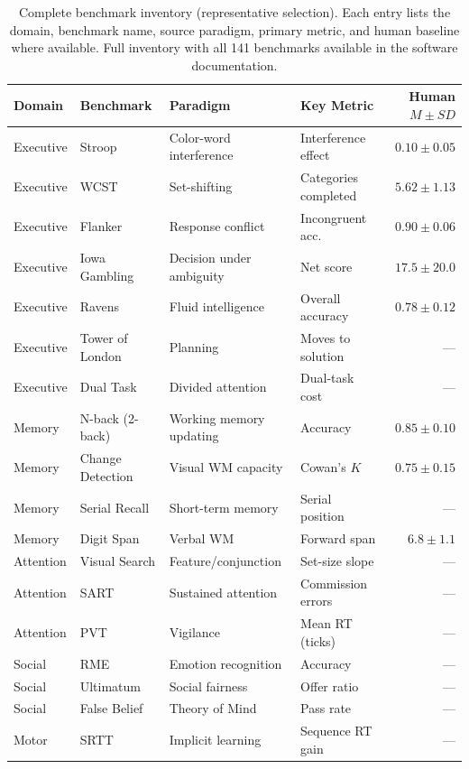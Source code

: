 \documentclass[11pt,letterpaper]{article}
\begin{document}
\begin{table}[p]
\centering
\caption{Complete benchmark inventory (representative selection). Each entry lists the domain, benchmark name, source paradigm, primary metric, and human baseline where available. Full inventory with all 141 benchmarks available in the software documentation.}
\label{tab:inventory}
\small
\begin{tabular}{@{}llllr@{}}
\toprule
\textbf{Domain} & \textbf{Benchmark} & \textbf{Paradigm} & \textbf{Key Metric} & \textbf{Human $M \pm SD$} \\
\midrule
Executive & Stroop & Color-word interference & Interference effect & $0.10 \pm 0.05$ \\
Executive & WCST & Set-shifting & Categories completed & $5.62 \pm 1.13$ \\
Executive & Flanker & Response conflict & Incongruent acc. & $0.90 \pm 0.06$ \\
Executive & Iowa Gambling & Decision under ambiguity & Net score & $17.5 \pm 20.0$ \\
Executive & Ravens & Fluid intelligence & Overall accuracy & $0.78 \pm 0.12$ \\
Executive & Tower of London & Planning & Moves to solution & --- \\
Executive & Dual Task & Divided attention & Dual-task cost & --- \\
\midrule
Memory & N-back (2-back) & Working memory updating & Accuracy & $0.85 \pm 0.10$ \\
Memory & Change Detection & Visual WM capacity & Cowan's $K$ & $0.75 \pm 0.15$ \\
Memory & Serial Recall & Short-term memory & Serial position & --- \\
Memory & Digit Span & Verbal WM & Forward span & $6.8 \pm 1.1$ \\
\midrule
Attention & Visual Search & Feature/conjunction & Set-size slope & --- \\
Attention & SART & Sustained attention & Commission errors & --- \\
Attention & PVT & Vigilance & Mean RT (ticks) & --- \\
\midrule
Social & RME & Emotion recognition & Accuracy & --- \\
Social & Ultimatum & Social fairness & Offer ratio & --- \\
Social & False Belief & Theory of Mind & Pass rate & --- \\
\midrule
Motor & SRTT & Implicit learning & Sequence RT gain & --- \\

\end{tabular}
\end{table}
\end{document}
